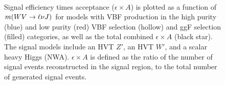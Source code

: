 \begin{figure}[tbp]
\centering
{}
\\
\caption[Signal efficiency times acceptance for models with vector boson fusion production]{Signal efficiency times acceptance ($\epsilon\times A$) is plotted as a function of $m(WV\rightarrow\ell\nu J)$ for models with VBF production in the high purity (blue) and low purity (red) VBF selection (hollow) and ggF selection (filled) categories, as well as the total combined $\epsilon\times A$ (black star). The signal models include \protect{} an HVT $Z'$, \protect{} an HVT $W'$, and \protect{} a scalar heavy Higgs (NWA). $\epsilon\times A$ is defined as the ratio of the number of signal events reconstructed in the signal region, to the total number of generated signal events. }
\label{fig:sig_acc_vbf}
\end{figure}

